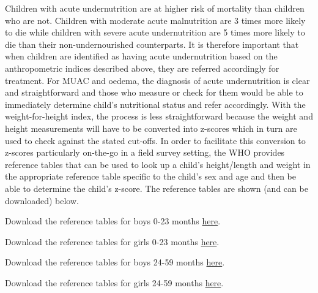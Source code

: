 \documentclass[12pt,]{book}
\theoremstyle{definition}
\theoremstyle{definition}
\theoremstyle{definition}
\theoremstyle{remark}
\let\BeginKnitrBlock\begin \let\EndKnitrBlock\end
\begin{document}
Children with acute undernutrition are at higher risk of mortality than
children who are not. Children with moderate acute malnutrition are 3
times more likely to die while children with severe acute undernutrition
are 5 times more likely to die than their non-undernourished
counterparts. It is therefore important that when children are
identified as having acute undernutrition based on the anthropometric
indices described above, they are referred accordingly for treatment.
For MUAC and oedema, the diagnosis of acute undernutrition is clear and
straightforward and those who measure or check for them would be able to
immediately determine child's nutritional status and refer accordingly.
With the weight-for-height index, the process is less straightforward
because the weight and height measurements will have to be converted
into z-scores which in turn are used to check against the stated
cut-offs. In order to facilitate this conversion to z-scores
particularly on-the-go in a field survey setting, the WHO provides
reference tables that can be used to look up a child's height/length and
weight in the appropriate reference table specific to the child's sex
and age and then be able to determine the child's z-score. The reference
tables are shown (and can be downloaded) below.

\BeginKnitrBlock{rmddownload}
Download the reference tables for boys 0-23 months
\href{\%22pdf/boys_0_24.pdf\%22}{here}.
\EndKnitrBlock{rmddownload}

\BeginKnitrBlock{rmddownload}
Download the reference tables for girls 0-23 months
\href{\%22pdf/girls_0_24.pdf\%22}{here}.
\EndKnitrBlock{rmddownload}

\BeginKnitrBlock{rmddownload}
Download the reference tables for boys 24-59 months
\href{\%22pdf/boys_24_60.pdf\%22}{here}.
\EndKnitrBlock{rmddownload}

\BeginKnitrBlock{rmddownload}
Download the reference tables for girls 24-59 months
\href{\%22pdf/girls_24_60.pdf\%22}{here}.
\EndKnitrBlock{rmddownload}

\newpage
\end{document}
